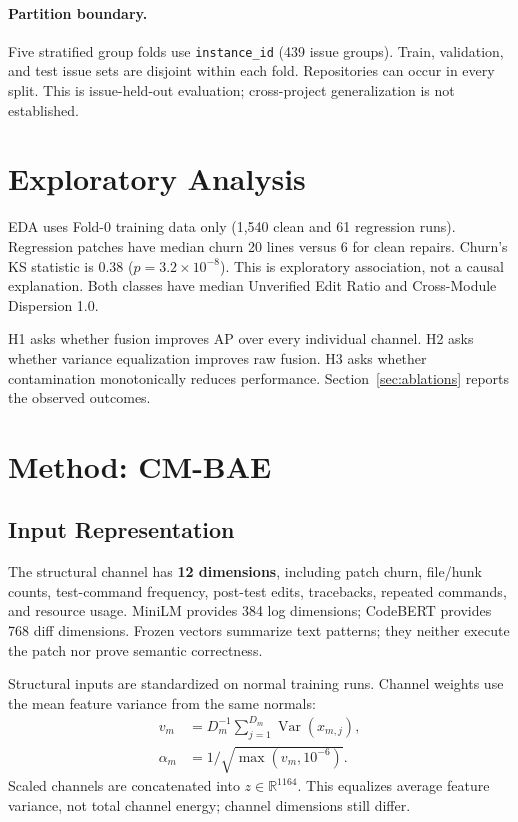 \paragraph{Partition boundary.}
Five stratified group folds use \texttt{instance\_id} (439 issue groups). Train, validation, and test issue sets are disjoint within each fold. Repositories can occur in every split. This is issue-held-out evaluation; cross-project generalization is not established.

\section{Exploratory Analysis}
EDA uses Fold-0 training data only (1,540 clean and 61 regression runs). Regression patches have median churn 20 lines versus 6 for clean repairs. Churn's KS statistic is 0.38 ($p=3.2\times10^{-8}$). This is exploratory association, not a causal explanation. Both classes have median Unverified Edit Ratio and Cross-Module Dispersion 1.0.

H1 asks whether fusion improves AP over every individual channel. H2 asks whether variance equalization improves raw fusion. H3 asks whether contamination monotonically reduces performance. Section~\ref{sec:ablations} reports the observed outcomes.

\clearpage
\section{Method: CM-BAE}
\label{sec:method}
\subsection{Input Representation}
The structural channel has \textbf{12 dimensions}, including patch churn, file/hunk counts, test-command frequency, post-test edits, tracebacks, repeated commands, and resource usage. MiniLM provides 384 log dimensions; CodeBERT provides 768 diff dimensions. Frozen vectors summarize text patterns; they neither execute the patch nor prove semantic correctness.

Structural inputs are standardized on normal training runs. Channel weights use the mean feature variance from the same normals:
\begin{align}
v_m &= D_m^{-1}\sum_{j=1}^{D_m}\operatorname{Var}(x_{m,j}),\\
\alpha_m &= 1/\sqrt{\max(v_m,10^{-6})}.
\end{align}
Scaled channels are concatenated into $z\in\mathbb{R}^{1164}$. This equalizes average feature variance, not total channel energy; channel dimensions still differ.

